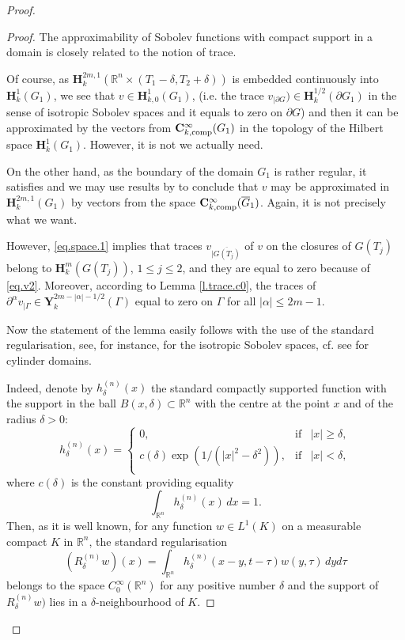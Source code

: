 \documentclass{amsart}
\theoremstyle{definition}
\theoremstyle{remark}
\numberwithin{equation}{section}
\begin{document}
\begin{proof}
\begin{proof} The approximability of Sobolev functions with compact support in a 
domain is closely related to the notion of trace. 
  
Of course, as  $\textbf{H}^{2m,1}_k ({\mathbb R}^{n}  \times (T_1-\delta,T_2+\delta)) $
is embedded continuously into  $\textbf{H}^1_k (G_1)$, we see that $v \in \textbf{H}^1_{k,0}
(G_1)$, (i.e. the trace $v_{|\partial G}) \in \textbf{H}^{1/2}_{k}(\partial G_1)$ in the 
sense of isotropic Sobolev spaces and it equals to zero on $\partial G$) and then it can be 
approximated by the vectors from $\mathbf{C}^\infty_{k,{\rm comp}}  (G_1)$ in the topology of 
the Hilbert space $\textbf{H}^1_k (G_1)$. However, it is not we actually need. 

On the other hand, as the boundary of the domain $G_1$ is rather regular, it satisfies 
\cite[Condition A]{Alb} and we may use results by \cite{Alb} to conclude that $v$ may be 
approximated in $\mathbf{H}^{2m,1}_k (G_1)$ by vectors from the space 
${\mathbf C}_{k, {\rm comp}}^\infty  (\overline G_1)$. Again, it is not precisely 
what we want. 

However, \eqref{eq.space.1} implies that  traces $v_{|\overline{G(T_j)}}$ of $v$ on the 
closures of  $G(T_j)$ belong to $\mathbf{H}^{m}_k(G(T_j)) $, $1\leq j \leq 2$,  and they are 
equal to zero because of \eqref{eq.v2}. Moreover, according to Lemma \ref{l.trace.c0}, the 
traces of $\partial ^\alpha v_{|\Gamma} \in {\mathbf Y}_k^{2m-|\alpha|-1/2} (\Gamma)$ equal 
to zero on $\Gamma$ for all $|\alpha|\leq 2m-1$.

Now the statement of the lemma 
easily follows with the use of the standard regularisation, see, for instance,  
\cite[ch. 3, \S 5, \S 7,]{MikhX} for the isotropic Sobolev spaces, cf.  
see \cite{ShHeat} for cylinder domains. 

Indeed, denote by $h^{(n)}_\delta (x)$ the standard compactly supported function with 
the support in the  ball  $B(x,\delta) \subset {\mathbb R}^n$ with the centre  
at the point  $x$ and of the radius   $\delta>0$:
$$
h^{(n)}_\delta (x) = \left\{
\begin{array}{lll}
0, & \mathrm{if} & |x|\geq \delta, \\
c(\delta) \exp{(1/(|x|^2-\delta^2))}, & \mathrm{if} & |x|<\delta, \\
\end{array}
\right.
$$
where $c(\delta) $ is  the constant providing equality 
$$
\int_{{\mathbb R}^n} h_{\delta}^{(n)}(x) \, dx =1.
$$
Then, as it is well known, for any function $w \in L^1 (K)$ on a measurable compact 
$K$ in ${\mathbb R}^n$, the standard regularisation  
$$
(R ^{(n)}_\delta w) (x) = \int_{{\mathbb R}^{n}} h^{(n)}_\delta (x-y,t-\tau) w (y,\tau) \, dy d\tau 
$$
belongs to the space  $C^\infty_0  ({\mathbb R}^{n})$ for any positive number 
$\delta$ and the support of $R ^{(n)}_\delta w) $ lies in a $\delta$-neighbourhood of $K$.    


\end{proof}
\end{proof}
\end{document}
